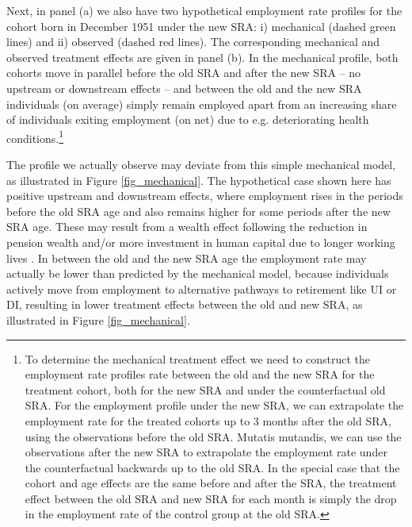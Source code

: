 \documentclass[12pt,a4paper]{article}
\begin{document}
Next, in panel (a) we also have two hypothetical employment rate profiles for the cohort born in December 1951 under the new SRA: i) mechanical (dashed green lines) and ii) observed (dashed red lines). The corresponding mechanical and observed treatment effects are given in panel (b). In the mechanical profile, both cohorts move in parallel before the old SRA and after the new SRA -- no upstream or downstream effects -- and between the old and the new SRA individuals (on average) simply remain employed apart from an increasing share of individuals exiting employment (on net) due to e.g. deteriorating health conditions.\footnote{To determine the mechanical treatment effect we need to construct the employment rate profiles rate between the old and the new SRA for the treatment cohort, both for the new SRA and under the counterfactual old SRA. For the employment profile under the new SRA, we can extrapolate the employment rate for the treated cohorts up to 3 months after the old SRA, using the observations before the old SRA. Mutatis mutandis, we can use the observations after the new SRA to extrapolate the employment rate under the counterfactual backwards up to the old SRA. In the special case that the cohort and age effects are the same before and after the SRA, the treatment effect between the old SRA and new SRA for each month is simply the drop in the employment rate of the control group at the old SRA.} 

The profile we actually observe may deviate from this simple mechanical model, as illustrated in Figure \ref{fig_mechanical}. The hypothetical case shown here has positive upstream and downstream effects, where employment rises in the periods before the old SRA age and also remains higher for some periods after the new SRA age. These may result from a wealth effect following the reduction in pension wealth \citep{gustman_steinmeijer_1986,hairault_distance_2010,van_erp_non-financial_2014} and/or more investment in human capital due to longer working lives \citep{jacobs_2010}. 
In between the old and the new SRA age the employment rate may actually be lower than predicted by the mechanical model, because individuals actively move from employment to alternative pathways to retirement like UI or DI, resulting in lower treatment effects between the old and new SRA, as illustrated in Figure \ref{fig_mechanical}.         
\end{document}
